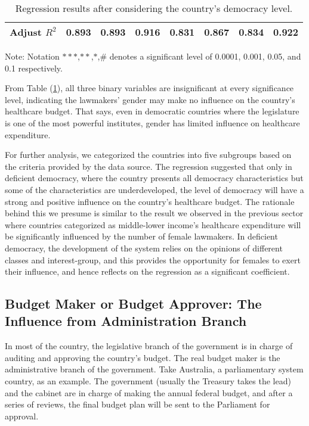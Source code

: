 \begin{table}[]
\begin{tabular}{l|lllllll}
Adjust $R^2$             & 0.893                                                              & 0.893                                                              & 0.916                                                             & 0.831                                                               & 0.867                                                             & 0.834                                                              & 0.922                                                             \\ \hline
\end{tabular}
\begin{tablenotes}
\small
      \item Note: Notation $***$,$**$,$*$,$\#$ denotes a significant level of 0.0001, 0.001, 0.05, and 0.1 respectively.
    \end{tablenotes}
    \caption{Regression results after considering the country's democracy level. }
    \label{Democracy}
\end{table}

From Table (\ref{Democracy}), all three binary variables are insignificant at every significance level, indicating the lawmakers' gender may make no influence on the country's healthcare budget.
That says, even in democratic countries where the legislature is one of the most powerful institutes, gender has limited influence on healthcare expenditure.

For further analysis, we categorized the countries into five subgroups based on the criteria provided by the data source. 
The regression suggested that only in deficient democracy, where the country presents all democracy characteristics but some of the characteristics are underdeveloped, the level of democracy will have a strong and positive influence on the country's healthcare budget.
The rationale behind this we presume is similar to the result we observed in the previous sector where countries categorized as middle-lower income's healthcare expenditure will be significantly influenced by the number of female lawmakers. 
In deficient democracy, the development of the system relies on the opinions of different classes and interest-group, and this provides the opportunity for females to exert their influence, and hence reflects on the regression as a significant coefficient. 

\subsection{Budget Maker or Budget Approver: The Influence from Administration Branch}
In most of the country, the legislative branch of the government is in charge of auditing and approving the country's budget.
The real budget maker is the administrative branch of the government.
Take Australia, a parliamentary system country, as an example.
The government (usually the Treasury takes the lead) and the cabinet are in charge of making the annual federal budget, and after a series of reviews, the final budget plan will be sent to the Parliament for approval.

